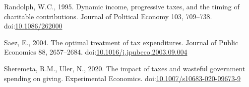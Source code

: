 \documentclass[
]{article}
\newlength{\cslhangindent}
\newlength{\cslentryspacingunit} %
\newenvironment{CSLReferences}[2] %
 {%
  \setlength{\parindent}{0pt}
  \ifodd #1
  \let\oldpar\par
  \def\par{\hangindent=\cslhangindent\oldpar}
  \fi
  \setlength{\parskip}{#2\cslentryspacingunit}
 }%
 {}
\begin{document}
\begin{CSLReferences}{1}{0}
\leavevmode\hypertarget{ref-Randolph1995}{}%
Randolph, W.C., 1995. Dynamic income, progressive taxes, and the timing of charitable contributions. Journal of Political Economy 103, 709--738. doi:\href{https://doi.org/10.1086/262000}{10.1086/262000}

\leavevmode\hypertarget{ref-Saez2004}{}%
Saez, E., 2004. The optimal treatment of tax expenditures. Journal of Public Economics 88, 2657--2684. doi:\href{https://doi.org/10.1016/j.jpubeco.2003.09.004}{10.1016/j.jpubeco.2003.09.004}

\leavevmode\hypertarget{ref-Sheremeta2020}{}%
Sheremeta, R.M., Uler, N., 2020. The impact of taxes and wasteful government spending on giving. Experimental Economics. doi:\href{https://doi.org/10.1007/s10683-020-09673-9}{10.1007/s10683-020-09673-9}

\end{CSLReferences}
\end{document}
